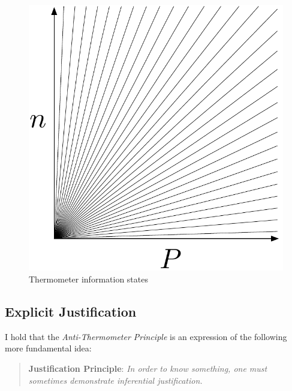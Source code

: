 \documentclass[11pt]{article}
\numberwithin{equation}{subsection}
\begin{document}
\begin{figure}[ht]
\begin{center}
\includegraphics[scale=.5]{therm.pdf} 
\end{center}
\caption{Thermometer information states}
\label{fig:therm2}
\end{figure}

\subsection{Explicit Justification}\label{explicit}

I hold that the \emph{Anti-Thermometer Principle} is an expression of
the following more fundamental idea:
\begin{quote}
 \textbf{Justification Principle}: \emph{In order to know something,
   one must sometimes demonstrate inferential justification.}
\end{quote}
\end{document}
